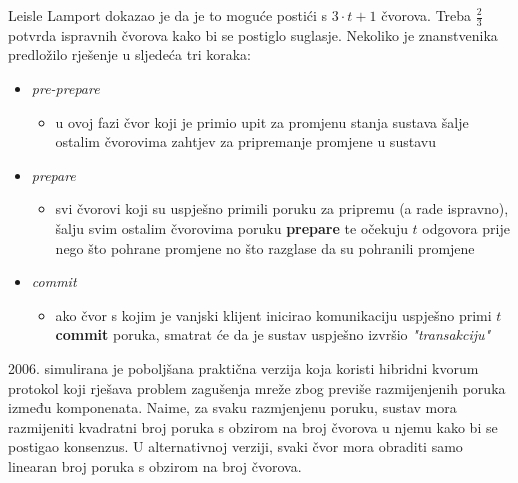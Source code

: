\documentclass[utf8, zavrsni]{fer}
\begin{document}
Leisle Lamport \cite{lamport1982the} dokazao je da je to moguće postići s $3 \cdot t + 1$ čvorova. Treba $\frac{2}{3}$ potvrda ispravnih čvorova kako bi se postiglo suglasje.
Nekoliko je znanstvenika predložilo rješenje u sljedeća tri koraka:
\begin{itemize}
    \item \textit{pre-prepare}
    \begin{itemize}
        \item u ovoj fazi čvor koji je primio upit za promjenu stanja sustava šalje ostalim čvorovima  zahtjev za pripremanje promjene u sustavu
    \end{itemize}
    \item \textit{prepare}
    \begin{itemize}
        \item svi čvorovi koji su uspješno primili poruku za pripremu (a rade ispravno), šalju svim ostalim čvorovima poruku \textbf{prepare} te očekuju $t$ odgovora prije nego što pohrane promjene no što razglase da su pohranili promjene
    \end{itemize}
    \item \textit{commit}
    \begin{itemize}
        \item ako čvor s kojim je vanjski klijent inicirao komunikaciju uspješno primi $t$ \textbf{commit} poruka, smatrat će da je sustav uspješno izvršio \textit{"transakciju"}
    \end{itemize}
\end{itemize}

2006. simulirana je poboljšana praktična verzija koja koristi hibridni kvorum protokol \cite{hqbft} koji rješava problem zagušenja mreže zbog previše razmijenjenih poruka između komponenata. Naime, za svaku razmjenjenu poruku, sustav mora razmijeniti kvadratni broj poruka s obzirom na broj čvorova u njemu kako bi se postigao konsenzus. U alternativnoj verziji, svaki čvor mora obraditi samo linearan broj poruka s obzirom na broj čvorova.
\end{document}

